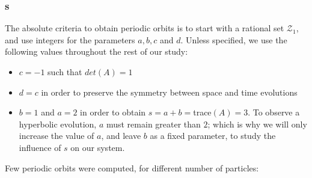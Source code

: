 \subsubsection{\Po s}

The absolute criteria to obtain periodic orbits is to start with a
rational set $\mathcal{Z}_1$, and use integers for the parameters $a, b,
c$ and $d$. Unless specified, we use the following values throughout the
rest of our study:

\begin{itemize}
\item
$c = -1$ such that $det(A) = 1$
\item
$d = c$ in order to preserve the symmetry between space and time evolutions
\item
$b = 1$ and $a = 2$ in order to obtain $s = a+b = $trace$(A) = 3$. To observe a hyperbolic evolution, $a$ must remain greater than $2$; which is why we will only increase the value of $a$, and leave $b$ as a fixed parameter, to study the influence of $s$ on our system.
\end{itemize}
Few periodic orbits were computed, for different number of particles:

